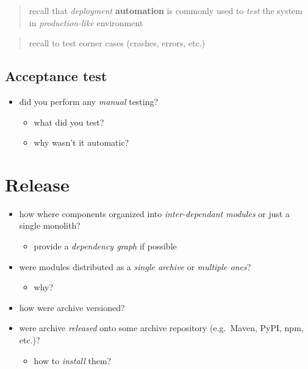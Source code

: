 \documentclass{scrartcl}
\begin{document}
\begin{quote}
recall that \emph{deployment} \textbf{automation} is commonly used to
\emph{test} the system in \emph{production-like} environment
\end{quote}

\begin{quote}
recall to test corner cases (crashes, errors, etc.)
\end{quote}

\subsection{Acceptance test}\label{acceptance-test}

\begin{itemize}
  \item did you perform any \emph{manual} testing?

  \begin{itemize}
    \item what did you test?
    \item why wasn't it automatic?
  \end{itemize}
\end{itemize}

\section{Release}\label{release}

\begin{itemize}
  \item how where components organized into \emph{inter-dependant modules} or
  just a single monolith?

  \begin{itemize}
    \item provide a \emph{dependency graph} if possible
  \end{itemize}
  \item were modules distributed as a \emph{single archive} or \emph{multiple
  ones}?

  \begin{itemize}
    \item why?
  \end{itemize}
  \item how were archive versioned?
  \item were archive \emph{released} onto some archive repository (e.g.~Maven,
  PyPI, npm, etc.)?

  \begin{itemize}
    \item how to \emph{install} them?
  \end{itemize}
\end{itemize}
\end{document}
